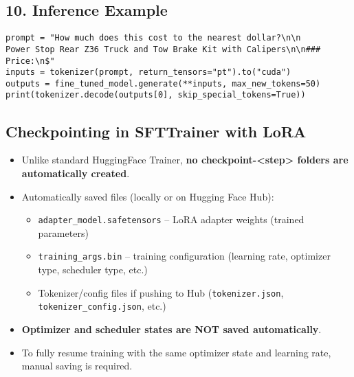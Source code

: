 \documentclass[a4paper, 12pt]{article}
\begin{document}
\subsection*{10. Inference Example}
\begin{tcolorbox}[colback=green!5!white, colframe=green!75!black, title=Inference Example]
\begin{verbatim}
prompt = "How much does this cost to the nearest dollar?\n\n
Power Stop Rear Z36 Truck and Tow Brake Kit with Calipers\n\n### Price:\n$"
inputs = tokenizer(prompt, return_tensors="pt").to("cuda")
outputs = fine_tuned_model.generate(**inputs, max_new_tokens=50)
print(tokenizer.decode(outputs[0], skip_special_tokens=True))
\end{verbatim}
\end{tcolorbox}



\subsection*{Checkpointing in SFTTrainer with LoRA}

\begin{tcolorbox}[colback=green!5!white, colframe=green!75!black, title=What Actually Happens During Training]
\begin{itemize}
    \item Unlike standard HuggingFace Trainer, \textbf{no checkpoint-<step> folders are automatically created}.
    \item Automatically saved files (locally or on Hugging Face Hub):
    \begin{itemize}
        \item \texttt{adapter\_model.safetensors} -- LoRA adapter weights (trained parameters)
        \item \texttt{training\_args.bin} -- training configuration (learning rate, optimizer type, scheduler type, etc.)
        \item Tokenizer/config files if pushing to Hub (\texttt{tokenizer.json}, \texttt{tokenizer\_config.json}, etc.)
    \end{itemize}
    \item \textbf{Optimizer and scheduler states are NOT saved automatically}. 
    \item To fully resume training with the same optimizer state and learning rate, manual saving is required.
\end{itemize}
\end{tcolorbox}
\end{document}
